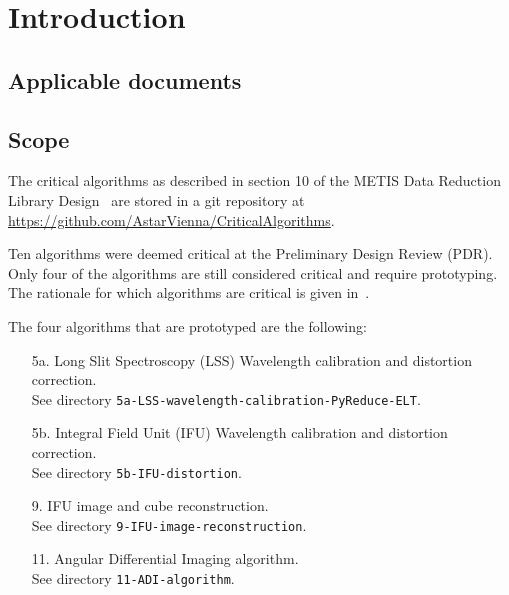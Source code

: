 \documentclass[11pt,oneside,a4paper]{article}
\newcommand{\CODE}[1]{\lstinline[]!#1!}
\begin{document}




\section{Introduction}
\label{sec:intro}

\subsection{Applicable documents}
\label{ssec:ad}
\begin{refcontext}[labelprefix=AD]
  \printbibliography[keyword=applicable, heading=none]
\end{refcontext}

\subsection{Scope}
\label{ssec:scope}
The critical algorithms as described in section 10 of the METIS Data Reduction Library Design~\cite{DRLD} are stored in a git repository at \url{https://github.com/AstarVienna/CriticalAlgorithms}.

Ten algorithms were deemed critical at the Preliminary Design Review (PDR).
Only four of the algorithms are still considered critical and require prototyping.
The rationale for which algorithms are critical is given in~\cite{DRLD}.

The four algorithms that are prototyped are the following:
\begin{enumerate}
    \item[5a.] Long Slit Spectroscopy (LSS) Wavelength calibration and distortion correction.\\
        See directory \CODE{5a-LSS-wavelength-calibration-PyReduce-ELT}.
    \item[5b.] Integral Field Unit (IFU) Wavelength calibration and distortion correction.\\
        See directory \CODE{5b-IFU-distortion}.
    \item[9.] IFU image and cube reconstruction.\\
        See directory \CODE{9-IFU-image-reconstruction}.
    \item[11.] Angular Differential Imaging algorithm.\\
        See directory \CODE{11-ADI-algorithm}.
\end{enumerate}
\end{document}
